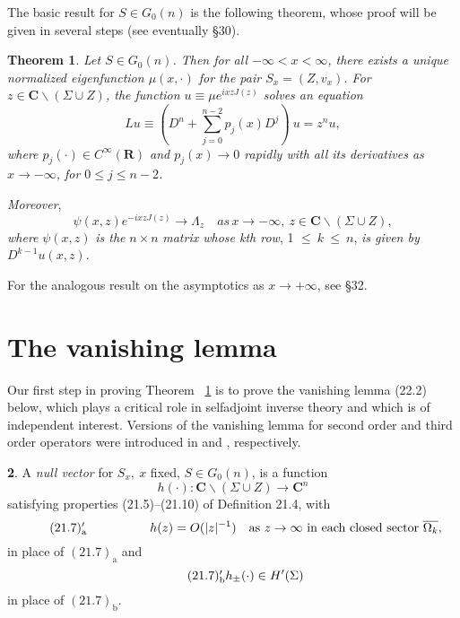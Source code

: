\documentclass{surv-l}
\theoremstyle{plain}
\newtheorem{theorem}{Theorem}[section]
\theoremstyle{definition}
\newtheorem{definition}[theorem]{\sc{Definition}}
\numberwithin{equation}{chapter}
\begin{document}
The basic result for $S\in G_{0}(n)$ is the following theorem, whose proof will be given in several steps (see eventually \S 30).
\setcounter{theorem}{10}
\begin{theorem}\label{thm21.11}
Let $S\in G_{0}(n)$.  Then for all $-\infty<x<\infty$, there exists a unique normalized eigenfunction $\mu(x,\cdot)$ for the pair $S_{x}= (Z, v_{x})$. For $z\in \mathbf{C}\backslash (\Sigma\cup Z)$, the function $u\equiv\mu e^{ixzJ(z)}$ solves an equation
\setcounter{equation}{11}
\begin{equation}\label{eq21.12}
Lu\equiv\left(D^{n}+\sum_{j=0}^{n-2}p_{j}(x)D^{j}\right)\ u=z^{n}u,
\end{equation}
where $p_{j}(\cdot)\in C^{\infty}(\mathbf{R})$ and $ p_{j}(x)\rightarrow 0$ rapidly with all its derivatives as $ x\rightarrow-\infty$, for $ 0\leq j \leq n-2$.
\end{theorem}


\emph{Moreover},
\begin{equation}\label{eq21.13}
\psi(x, z)e^{-ixzJ(z)}\rightarrow\Lambda_{z}\quad as\,x\rightarrow-\infty,\ z\in \mathbf{C}\backslash (\Sigma\cup Z),
\end{equation}
\emph{where} $\psi(x, z)$ \emph{is the} $n \times n$ \emph{matrix whose kth row}, 1  $\leq\ k\ \leq\ n$, \emph{is given by} $D^{k-1}u(x, z)$.

For the analogous result on the asymptotics as $x\rightarrow + \infty$, see \S32.
\setcounter{section}{21}
\section{The vanishing lemma}\label{sec22}
Our first step in proving Theorem ~\ref{thm21.11} is to prove the vanishing lemma (22.2)  below, which plays a critical role in selfadjoint inverse theory and which is of independent interest. Versions of the vanishing lemma for second order and third order operators were introduced in \cite{DT} and \cite{DTT}, respectively.
\setcounter{theorem}{0}
\begin{definition}\label{defi22.1}
A \emph{null vector}  for $S_{x},\ x$ fixed, $S\in G_{0}(n)$, is a function
\begin{equation*}
h(\cdot):\mathbf{C}\backslash (\Sigma\cup Z)\rightarrow \mathbf{C}^{n}
\end{equation*}
satisfying properties (21.5)--(21.10) of Definition 21.4, with
\begin{equation*}
\tag*{$(21.7)_{\mathrm{a}}^{\prime}$} \qquad \qquad \quad h(z)=O(|z|^{-1})\quad \mathrm{as}\  z\rightarrow\infty\ \text{in each closed sector}\ \overline{\Omega_{k}},
\end{equation*}
in place of $(21.7)_{\mathrm{a}}$ and
\begin{equation*}
\tag*{$(21.7)_{\mathrm{b}}^{\prime}$} h_{\pm}(\cdot)\in H'(\Sigma)
\end{equation*}
in place of $(21.7)_{\mathrm{b}}$.
\end{definition}
\end{document}
